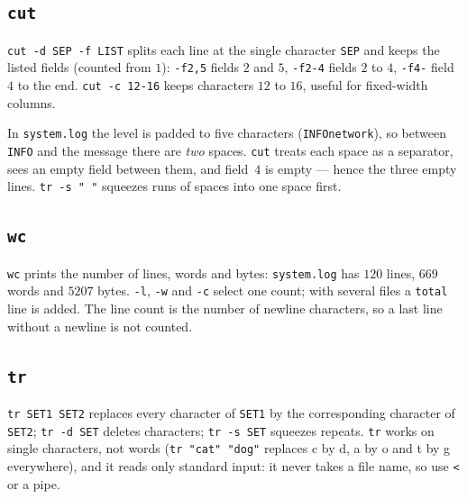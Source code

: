 \documentclass[11pt,a4paper]{article}
\newcommand{\cmd}[1]{\texttt{#1}}
\begin{document}
\subsection{\texttt{cut}}



\cmd{cut -d SEP -f LIST} splits each line at the single character \texttt{SEP} and keeps the listed fields (counted from $1$): \cmd{-f2,5} fields $2$ and $5$, \cmd{-f2-4} fields $2$ to $4$, \cmd{-f4-} field $4$ to the end. \cmd{cut -c 12-16} keeps characters $12$ to $16$, useful for fixed-width columns.

In \texttt{system.log} the level is padded to five characters (\texttt{INFO\textvisiblespace\textvisiblespace network}), so between \texttt{INFO} and the message there are \emph{two} spaces. \cmd{cut} treats each space as a separator, sees an empty field between them, and field~$4$ is empty --- hence the three empty lines. \cmd{tr -s " "} squeezes runs of spaces into one space first.

\subsection{\texttt{wc}}



\cmd{wc} prints the number of lines, words and bytes: \texttt{system.log} has $120$ lines, $669$ words and $5207$ bytes. \cmd{-l}, \cmd{-w} and \cmd{-c} select one count; with several files a \texttt{total} line is added. The line count is the number of newline characters, so a last line without a newline is not counted.

\subsection{\texttt{tr}}



\cmd{tr SET1 SET2} replaces every character of \texttt{SET1} by the corresponding character of \texttt{SET2}; \cmd{tr -d SET} deletes characters; \cmd{tr -s SET} squeezes repeats. \cmd{tr} works on single characters, not words (\cmd{tr "cat" "dog"} replaces c by d, a by o and t by g everywhere), and it reads only standard input: it never takes a file name, so use \cmd{<} or a pipe.

\end{document}
